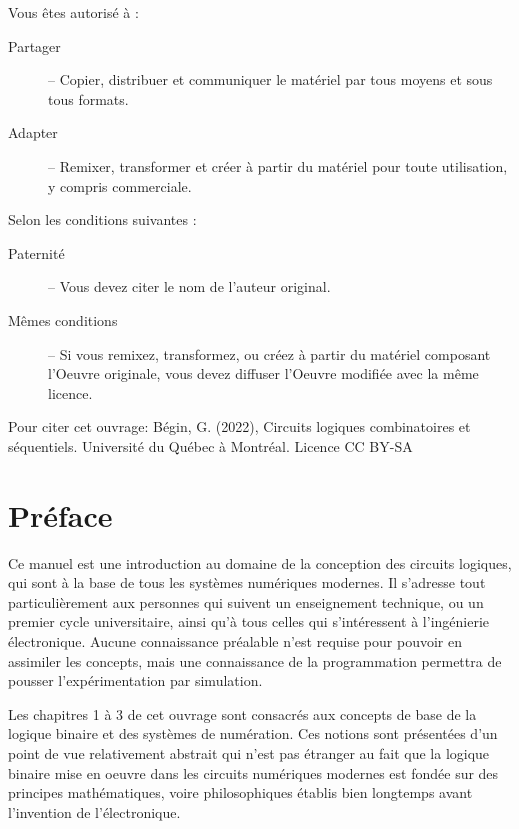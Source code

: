 \documentclass[11pt]{article}
\begin{document}
Vous êtes autorisé à : 

\begin{description}
\item[{Partager}] – Copier, distribuer et communiquer le matériel par tous
moyens et sous tous formats.
\item[{Adapter}] – Remixer, transformer et créer à partir du matériel pour
toute utilisation, y compris commerciale.
\end{description}

Selon les conditions suivantes :

\begin{description}
\item[{Paternité}] – Vous devez citer le nom de l'auteur original.
\item[{Mêmes conditions}] – Si vous remixez, transformez, ou créez à
partir du matériel composant l'Oeuvre originale, vous devez diffuser
l'Oeuvre modifiée avec la même licence.
\end{description}


Pour citer cet ouvrage: Bégin, G. (2022), Circuits logiques
combinatoires et séquentiels. Université du Québec à Montréal. Licence CC BY-SA

\begin{center}
\href{https://uqam.ca/}{} 
\end{center}


\section*{Préface}
\label{sec:orgc601634}
Ce manuel est une introduction au domaine de la conception des
circuits logiques, qui sont à la base de tous les systèmes numériques
modernes. Il s'adresse tout particulièrement aux personnes qui suivent
un enseignement technique, ou un premier cycle universitaire, ainsi
qu'à tous celles qui s'intéressent à l'ingénierie électronique.
Aucune connaissance préalable n'est requise pour pouvoir en assimiler
les concepts, mais une connaissance de la programmation permettra de
pousser l'expérimentation par simulation.

Les chapitres 1 à 3 de cet ouvrage sont consacrés aux concepts de base
de la logique binaire et des systèmes de numération. Ces notions sont
présentées d'un point de vue relativement abstrait qui n'est pas
étranger au fait que la logique binaire mise en oeuvre dans les
circuits numériques modernes est fondée sur des principes
mathématiques, voire philosophiques établis bien longtemps avant
l'invention de l'électronique.
\end{document}

